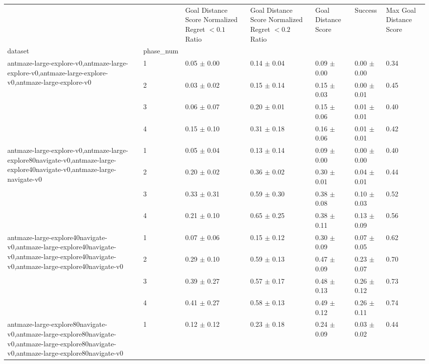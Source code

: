 \begin{tabular}{lllllll}
\toprule
 &  & Goal Distance Score Normalized Regret $< 0.1$ Ratio & Goal Distance Score Normalized Regret $< 0.2$ Ratio & Goal Distance Score & Success & Max Goal Distance Score \\
dataset & phase_num &  &  &  &  &  \\
\midrule
\multirow[t]{4}{*}{antmaze-large-explore-v0,antmaze-large-explore-v0,antmaze-large-explore-v0,antmaze-large-explore-v0} & 1 & 0.05 $\pm$ 0.00 & 0.14 $\pm$ 0.04 & 0.09 $\pm$ 0.00 & 0.00 $\pm$ 0.00 & 0.34 \\
 & 2 & 0.03 $\pm$ 0.02 & 0.15 $\pm$ 0.14 & 0.15 $\pm$ 0.03 & 0.00 $\pm$ 0.01 & 0.45 \\
 & 3 & 0.06 $\pm$ 0.07 & 0.20 $\pm$ 0.01 & 0.15 $\pm$ 0.06 & 0.01 $\pm$ 0.01 & 0.40 \\
 & 4 & 0.15 $\pm$ 0.10 & 0.31 $\pm$ 0.18 & 0.16 $\pm$ 0.06 & 0.01 $\pm$ 0.01 & 0.42 \\
\cline{1-7}
\multirow[t]{4}{*}{antmaze-large-explore-v0,antmaze-large-explore80navigate-v0,antmaze-large-explore40navigate-v0,antmaze-large-navigate-v0} & 1 & 0.05 $\pm$ 0.04 & 0.13 $\pm$ 0.14 & 0.09 $\pm$ 0.00 & 0.00 $\pm$ 0.00 & 0.40 \\
 & 2 & 0.20 $\pm$ 0.02 & 0.36 $\pm$ 0.02 & 0.30 $\pm$ 0.01 & 0.04 $\pm$ 0.01 & 0.44 \\
 & 3 & 0.33 $\pm$ 0.31 & 0.59 $\pm$ 0.30 & 0.38 $\pm$ 0.08 & 0.10 $\pm$ 0.03 & 0.52 \\
 & 4 & 0.21 $\pm$ 0.10 & 0.65 $\pm$ 0.25 & 0.38 $\pm$ 0.11 & 0.13 $\pm$ 0.09 & 0.56 \\
\cline{1-7}
\multirow[t]{4}{*}{antmaze-large-explore40navigate-v0,antmaze-large-explore40navigate-v0,antmaze-large-explore40navigate-v0,antmaze-large-explore40navigate-v0} & 1 & 0.07 $\pm$ 0.06 & 0.15 $\pm$ 0.12 & 0.30 $\pm$ 0.09 & 0.07 $\pm$ 0.05 & 0.62 \\
 & 2 & 0.29 $\pm$ 0.10 & 0.59 $\pm$ 0.13 & 0.47 $\pm$ 0.09 & 0.23 $\pm$ 0.07 & 0.70 \\
 & 3 & 0.39 $\pm$ 0.27 & 0.57 $\pm$ 0.17 & 0.48 $\pm$ 0.13 & 0.26 $\pm$ 0.12 & 0.73 \\
 & 4 & 0.41 $\pm$ 0.27 & 0.58 $\pm$ 0.13 & 0.49 $\pm$ 0.12 & 0.26 $\pm$ 0.11 & 0.74 \\
\cline{1-7}
\multirow[t]{4}{*}{antmaze-large-explore80navigate-v0,antmaze-large-explore80navigate-v0,antmaze-large-explore80navigate-v0,antmaze-large-explore80navigate-v0} & 1 & 0.12 $\pm$ 0.12 & 0.23 $\pm$ 0.18 & 0.24 $\pm$ 0.09 & 0.03 $\pm$ 0.02 & 0.44 \\

\end{tabular}
